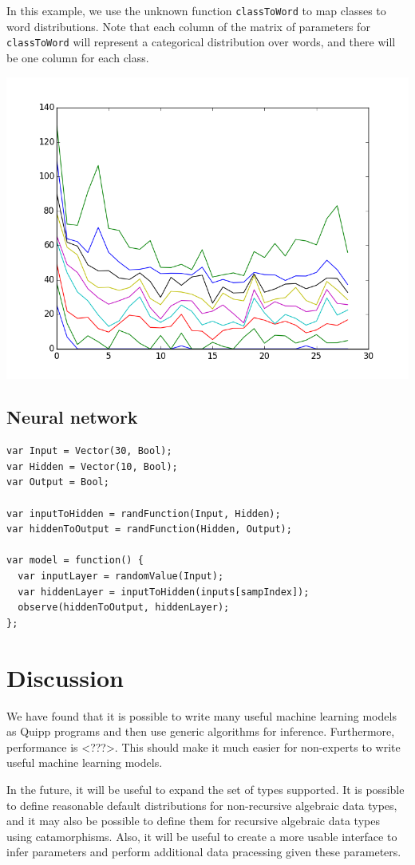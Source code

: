 \documentclass{article}
\begin{document}
In this example, we use the unknown function \texttt{classToWord} to map classes to word distributions.  Note that each column of the matrix of parameters for \texttt{classToWord} will represent a categorical distribution over words, and there will be one column for each class.

\begin{center}
  \includegraphics[scale=0.5]{../plots/accuracy_lda.png}
\end{center}
\subsection{Neural network}

{\small
\begin{lstlisting}
var Input = Vector(30, Bool);
var Hidden = Vector(10, Bool);
var Output = Bool;

var inputToHidden = randFunction(Input, Hidden);
var hiddenToOutput = randFunction(Hidden, Output);

var model = function() {
  var inputLayer = randomValue(Input);
  var hiddenLayer = inputToHidden(inputs[sampIndex]);
  observe(hiddenToOutput, hiddenLayer);
};
\end{lstlisting}
}

  \section{Discussion}

  We have found that it is possible to write many useful machine learning models as Quipp programs and then use generic algorithms for inference.  Furthermore, performance is <???>.  This should make it much easier for non-experts to write useful machine learning models.
  
  In the future, it will be useful to expand the set of types supported.  It is possible to define reasonable default distributions for non-recursive algebraic data types, and it may also be possible to define them for recursive algebraic data types using catamorphisms.  Also, it will be useful to create a more usable interface to infer parameters and perform additional data pracessing given these parameters.

{}

\end{document}
